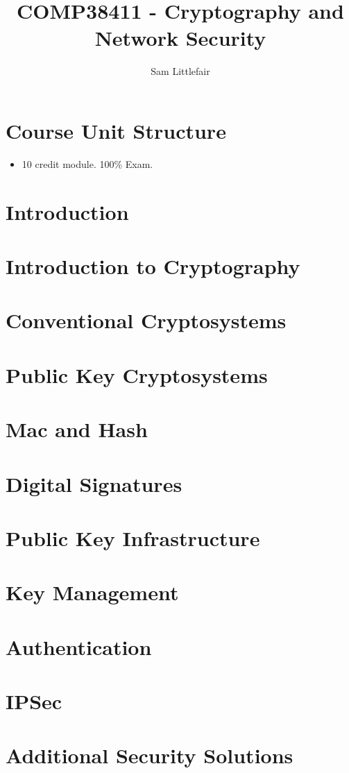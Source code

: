 \documentclass[11pt]{article}
\title{COMP38411 - Cryptography and Network Security}
\author{Sam Littlefair}
\begin{document}
\maketitle

\section{Course Unit Structure}
\begin{itemize}
  \item 10 credit module. 100\% Exam.
\end{itemize}

\section{Introduction}
\section{Introduction to Cryptography}
\section{Conventional Cryptosystems}
\section{Public Key Cryptosystems}
\section{Mac and Hash}
\section{Digital Signatures}
\section{Public Key Infrastructure}
\section{Key Management}
\section{Authentication}
\section{IPSec}
\section{Additional Security Solutions}
\end{document}
